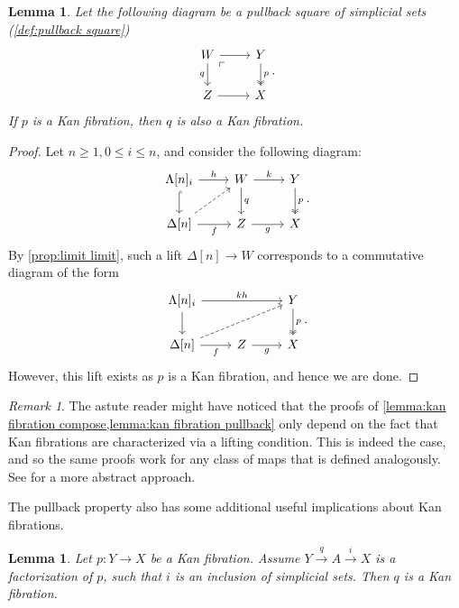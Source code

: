 \documentclass[11pt, a4paper]{amsart}
\newtheorem{lemma}[equation]{Lemma}
\theoremstyle{definition}
\theoremstyle{remark}
\newtheorem{remark}[equation]{Remark}
\numberwithin{equation}{section}
\begin{document}
\begin{lemma} \label{lemma:kan fibration pullback}
  Let the following diagram be a pullback square of simplicial sets (\cref{def:pullback square})
  \[
  \begin{tikzcd}
    W \arrow[r] \arrow[d, "q"'] \arrow[dr, phantom, "\ulcorner", very near start] & Y \arrow[d, "p", twoheadrightarrow] \\
    Z \arrow[r] & X
  \end{tikzcd}.
  \]
  If $p$ is a Kan fibration, then $q$ is also a Kan fibration.
\end{lemma}

\begin{proof}
  Let $n \geq 1, 0 \leq i \leq n$, and consider the following diagram:
  \[
    \begin{tikzcd}
     \Lambda[n]_i  \arrow[r, "h"] \arrow[d, hookrightarrow] & W \arrow[d, "q"]  \arrow[r, "k"] & Y \arrow[d, "p", twoheadrightarrow] \\
     \Delta[n] \arrow[ur, dashed]  \arrow[r, "f"'] & Z \arrow[r, "g"'] & X
    \end{tikzcd}.
  \]
  By \cref{prop:limit limit}, such a lift $\Delta[n] \to W$ corresponds to a commutative diagram of the form 
  \[
    \begin{tikzcd}
      \Lambda[n]_i \arrow[d] \arrow[rr, "kh"] & & Y \arrow[d, "p", twoheadrightarrow] \\ 
       \Delta[n] \arrow[r, "f"'] \arrow[urr, dashed] & Z \arrow[r, "g"'] & X
    \end{tikzcd}.
  \]
  However, this lift exists as $p$ is a Kan fibration, and hence we are done.
\end{proof}

\begin{remark}
  The astute reader might have noticed that the proofs of \cref{lemma:kan fibration compose,lemma:kan fibration pullback} only depend on the fact that Kan fibrations are characterized via a lifting condition. This is indeed the case, and so the same proofs work for any class of maps that is defined analogously. See \cite[Section 11.1]{riehl2014categoricalhomotopytheory} for a more abstract approach.
\end{remark}

The pullback property also has some additional useful implications about Kan fibrations.

\begin{lemma} \label{lemma:kan fibration factorization}
 Let $p\colon Y \to X$ be a Kan fibration. Assume $Y \xrightarrow{ \ q \ } A \xrightarrow{ \ i \ } X$ is a factorization of $p$, such that $i$ is an inclusion of simplicial sets. Then $q$ is a Kan fibration.
\end{lemma}
\end{document}
